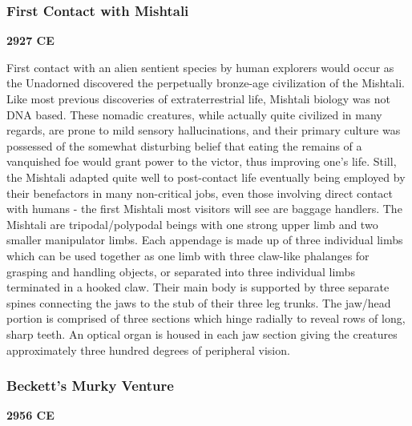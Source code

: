 \subsubsection{First Contact with Mishtali}
{\bf 2927 CE}

First contact with an alien sentient species by human explorers would
occur as the Unadorned discovered the perpetually bronze-age
civilization of the Mishtali.  Like most previous discoveries of
extraterrestrial life, Mishtali biology was not DNA based. These
nomadic creatures, while actually quite civilized in many regards, are
prone to mild sensory hallucinations, and their primary culture was
possessed of the somewhat disturbing belief that eating the remains of
a vanquished foe would grant power to the victor, thus improving one's
life.  Still, the Mishtali adapted quite well to post-contact life
eventually being employed by their benefactors in many non-critical
jobs, even those involving direct contact with humans - the first
Mishtali most visitors will see are baggage handlers.  The Mishtali
are tripodal/polypodal beings with one strong upper limb and two
smaller manipulator limbs.  Each appendage is made up of three
individual limbs which can be used together as one limb with three
claw-like phalanges for grasping and handling objects, or separated
into three individual limbs terminated in a hooked claw.  Their main
body is supported by three separate spines connecting the jaws to the
stub of their three leg trunks.  The jaw/head portion is comprised of
three sections which hinge radially to reveal rows of long, sharp
teeth.  An optical organ is housed in each jaw section giving the
creatures approximately three hundred degrees of peripheral vision.

\subsubsection{Beckett's Murky Venture}
\bf{ 2956 CE}

